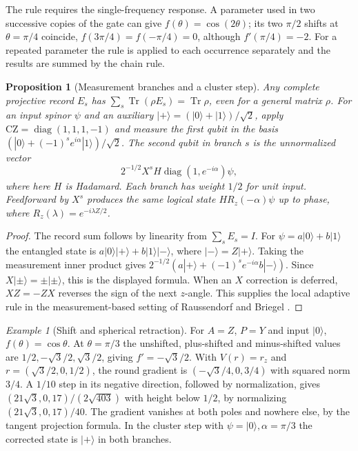 \documentclass[11pt,reqno]{amsart}
\newtheorem{proposition}[theorem]{Proposition}
\theoremstyle{definition}
\theoremstyle{remark}
\newtheorem{example}[theorem]{Example}
\numberwithin{equation}{section}
\begin{document}
The rule requires the single-frequency response. A parameter used in two
successive copies of the gate can give $f(\theta)=\cos(2\theta)$; its two
$\pi/2$ shifts at $\theta=\pi/4$ coincide, $f(3\pi/4)=f(-\pi/4)=0$, although
$f'(\pi/4)=-2$. For a repeated parameter the rule is applied to each
occurrence separately and the results are summed by the chain rule.

\begin{proposition}[Measurement branches and a cluster step]\label{m11:cluster}
Any complete projective record $E_s$ has
$\sum_s\operatorname{Tr}(\rho E_s)=\operatorname{Tr}\rho$,
even for a general matrix $\rho$. For an input spinor $\psi$
and an auxiliary $|+\rangle=(|0\rangle+|1\rangle)/\sqrt2$,
apply $\mathrm{CZ}=\operatorname{diag}(1,1,1,-1)$ and measure
the first qubit in the basis
$(|0\rangle+(-1)^s e^{i\alpha}|1\rangle)/\sqrt2$.
The second qubit in branch $s$ is the unnormalized vector
\[
 2^{-1/2}X^s H\operatorname{diag}(1,e^{-i\alpha})\psi ,
\]
where here $H$ is Hadamard. Each branch has weight $1/2$
for unit input. Feedforward by $X^s$ produces the same logical
state $H R_z(-\alpha)\psi$ up to phase, where
$R_z(\lambda)=e^{-i\lambda Z/2}$.
\end{proposition}
\begin{proof}
The record sum follows by linearity from $\sum_sE_s=I$.
For $\psi=a|0\rangle+b|1\rangle$ the entangled state is
$a|0\rangle|+\rangle+b|1\rangle| -\rangle$, where
$|-\rangle=Z|+\rangle$. Taking the measurement inner product
gives $2^{-1/2}(a|+\rangle+(-1)^se^{-i\alpha}b|-\rangle)$.
Since $X|\pm\rangle=\pm|\pm\rangle$, this is the displayed
formula. When an $X$ correction is deferred, $XZ=-ZX$ reverses the
sign of the next $z$-angle. This supplies the local adaptive
rule in the measurement-based setting of
Raussendorf and Briegel \cite{m11:RB}.
\end{proof}

\begin{example}[Shift and spherical retraction]\label{m11:gradient-example}\sloppy
For $A=Z$, $P=Y$ and input $|0\rangle$, $f(\theta)=\cos\theta$.
At $\theta=\pi/3$ the unshifted, plus-shifted and minus-shifted
values are $1/2,-\sqrt3/2,\sqrt3/2$, giving $f'=-\sqrt3/2$.
With $V(r)=r_z$ and $r=(\sqrt3/2,0,1/2)$, the round gradient
is $(-\sqrt3/4,0,3/4)$ with squared norm $3/4$.
A $1/10$ step in its negative direction, followed by normalization,
gives $(21\sqrt3,0,17)/(2\sqrt{403})$ with height below $1/2$,
by normalizing $(21\sqrt3,0,17)/40$.
The gradient vanishes at both poles and nowhere else, by
the tangent projection formula. In the cluster step with
$\psi=|0\rangle,\alpha=\pi/3$ the corrected state is $|+\rangle$
in both branches.
\end{example}
\end{document}
